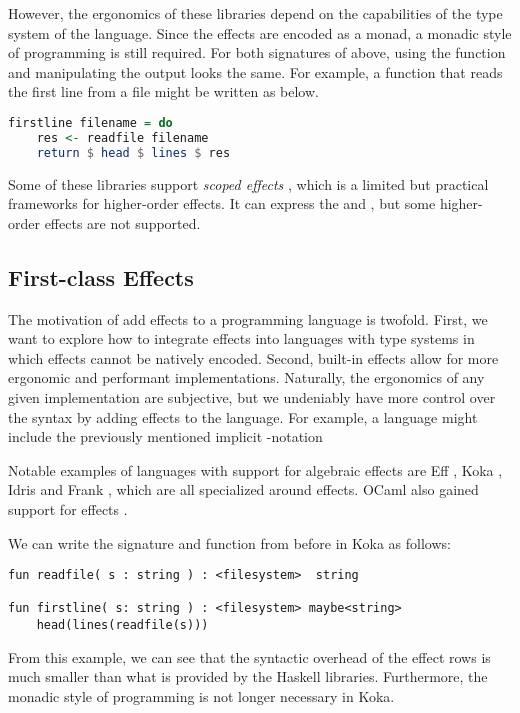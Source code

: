 However, the ergonomics of these libraries depend on the capabilities of the type system of the language.   Since the effects are encoded as a monad, a monadic style of programming is still required. For both signatures of  above, using the function and manipulating the output looks the same. For example, a function that reads the first line from a file might be written as below.
\begin{lstlisting}[language=Haskell,style=fancy,mathescape=false]
firstline filename = do
    res <- readfile filename
    return $ head $ lines $ res    
\end{lstlisting}

Some of these libraries support \emph{scoped effects} \autocite{wu_effect_2014}, which is a limited but practical frameworks for higher-order effects. It can express the \olocal and \ocatch, but some higher-order effects are not supported.

\subsection{First-class Effects}

The motivation of add effects to a programming language is twofold. First, we want to explore how to integrate effects into languages with type systems in which effects cannot be natively encoded. Second, built-in effects allow for more ergonomic and performant implementations. Naturally, the ergonomics of any given implementation are subjective, but we undeniably have more control over the syntax by adding effects to the language. For example, a language might include the previously mentioned implicit -notation

Notable examples of languages with support for algebraic effects are Eff \autocite{bauer_programming_2015}, Koka \autocite{leijen_type_2017}, Idris \autocite{brady_programming_2013} and Frank \autocite{lindley_be_2017}, which are all specialized around effects. OCaml also gained support for effects \autocite{sivaramakrishnan_retrofitting_2021}.

We can write the  signature and  function from before in Koka as follows:
\begin{lstlisting}[language={},style=fancy]
fun readfile( s : string ) : <filesystem>  string

fun firstline( s: string ) : <filesystem> maybe<string>
    head(lines(readfile(s)))
\end{lstlisting}
From this example, we can see that the syntactic overhead of the effect rows is much smaller than what is provided by the Haskell libraries. Furthermore, the monadic style of programming is not longer necessary in Koka.

